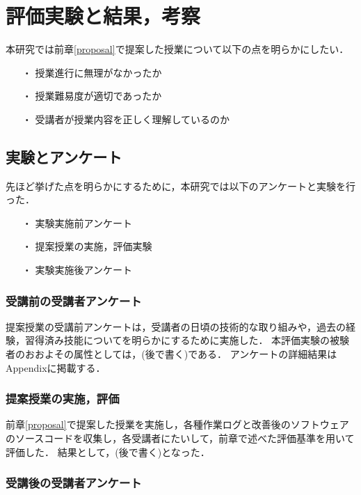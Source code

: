 \chapter{評価実験と結果，考察}

本研究では前章\ref{proposal}で提案した授業について以下の点を明らかにしたい．

\begin{itemize}
  \item[・] 授業進行に無理がなかったか
  \item[・] 授業難易度が適切であったか
  \item[・] 受講者が授業内容を正しく理解しているのか
\end{itemize}

\section{実験とアンケート}

先ほど挙げた点を明らかにするために，本研究では以下のアンケートと実験を行った．

\begin{itemize}
  \item[・] 実験実施前アンケート
  \item[・] 提案授業の実施，評価実験
  \item[・] 実験実施後アンケート
\end{itemize}

\subsection{受講前の受講者アンケート}

提案授業の受講前アンケートは，受講者の日頃の技術的な取り組みや，過去の経験，習得済み技能についてを明らかにするために実施した．
本評価実験の被験者のおおよその属性としては，(後で書く)である．
アンケートの詳細結果はAppendixに掲載する．

\subsection{提案授業の実施，評価}

前章\ref{proposal}で提案した授業を実施し，各種作業ログと改善後のソフトウェアのソースコードを収集し，各受講者にたいして，前章で述べた評価基準を用いて評価した．
結果として，(後で書く)となった．

\subsection{受講後の受講者アンケート}

